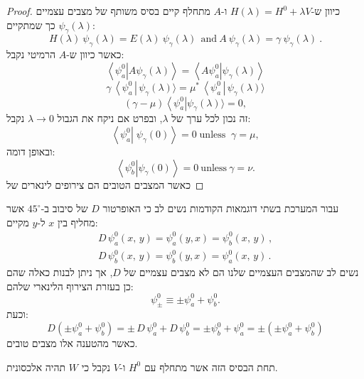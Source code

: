 \documentclass{tstextbook}
\begin{document}
\begin{proof}
כיוון ש-\(H\left( \lambda \right)=H^{0}+\lambda V\) ו-\(A\) מתחלף קיים בסיס משותף של מצבים עצמיים \(\psi_{\gamma}\left( \lambda \right)\) כך שמתקיים:
$$H(\lambda)\ \psi_{\gamma}(\lambda)=E(\lambda)\ \psi_{\gamma}(\lambda)\ \ \mathrm{and}\ A\ \psi_{\gamma}(\lambda)=\gamma\ \psi_{\gamma}(\lambda)\ .$$
כאשר כיוון ש-\(A\) הרמיטי נקבל:
$$\left\langle\psi_{a}^{0}\left|\right.A\psi_{\gamma}(\lambda)\right\rangle=\left\langle A\psi_{a}^{0}\left|\right.\psi_{\gamma}(\lambda)\right\rangle$$$$\gamma\,\left\langle\psi_{a}^{0}\,\right|\,\psi_{\gamma}(\lambda)\rangle=\mu^{*}\,\left\langle\psi_{a}^{0}\,\right|\,\psi_{\gamma}(\lambda)\rangle$$$$\left(\gamma-\mu\right)\left\langle\psi_{a}^{0}\right|\psi_{\gamma}(\lambda)\rangle=0,$$
זה נכון לכל ערך של \(\lambda\), ובפרט אם ניקח את הגבול \(\lambda\to 0\) נקבל:
$$\left\langle\psi_{a}^{0}\left|\;\psi_{\gamma}(0)\right\rangle=0\;\mathrm{unless}\;\;\gamma=\mu,\right.$$
ובאופן דומה:
$$\left\langle\psi_{b}^{0}\left|\right.\psi_{\gamma}(0)\right\rangle=0\mathrm{~unless~}\gamma=\nu.$$
כאשר המצבים הטובים הם צירופים לינארים של

\end{proof}
\begin{example}
עבור המערכת בשתי דוגמאות הקודמות נשים לב כי האופרטור \(D\) של סיבוב ב-\(45^\circ\) אשר מחליף בין \(x\) ל-\(y\) מקיים:
$$\begin{array}{l}{{D\,\psi_{a}^{0}(x,\,y)=\psi_{a}^{0}(y,x)=\psi_{b}^{0}(x,\,y)\,,}}\\ {{D\,\psi_{b}^{0}(x,\,y)=\psi_{b}^{0}(y,x)=\psi_{a}^{0}(x,\,y)\,.}}\end{array}$$
נשים לב שהמצבים העצמיים שלנו הם לא מצבים עצמיים של \(D\), אך ניתן לבנות כאלה שהם כן בעזרת הצירוף הלינארי שלהם:
$$\psi_{\pm}^{0}\equiv\pm\psi_{a}^{0}+\psi_{b}^{0}.$$
וכעת:
$$D\left(\pm\psi_{a}^{0}+\psi_{b}^{0}\right)=\pm\,D\,\psi_{a}^{0}+D\,\psi_{b}^{0}=\pm\psi_{b}^{0}+\psi_{a}^{0}=\pm\left(\pm\psi_{a}^{0}+\psi_{b}^{0}\right)$$
כאשר מהטענה אלו מצבים טובים.

\end{example}
\begin{remark}
תחת הבסיס הזה אשר מתחלף עם \(H^{0}\) ו-\(V\) נקבל כי \(W\) תהיה אלכסונית.

\end{remark}
\end{document}

